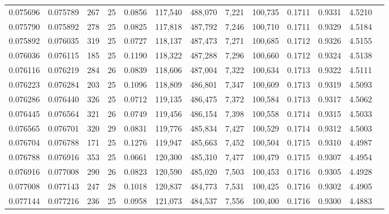 \begin{tabular}{rrrrrrrrrrrrr}
0.075696 & 0.075789 & 267 &  25 &                                     0.0856 & 117,540 & 488,070 &   7,221 & 100,735 & 0.1711 & 0.9331 & 4.5210 \\
0.075790 & 0.075892 & 278 &  25 &                                     0.0825 & 117,818 & 487,792 &   7,246 & 100,710 & 0.1711 & 0.9329 & 4.5184 \\
0.075892 & 0.076035 & 319 &  25 &                                     0.0727 & 118,137 & 487,473 &   7,271 & 100,685 & 0.1712 & 0.9326 & 4.5155 \\
0.076036 & 0.076115 & 185 &  25 &                                     0.1190 & 118,322 & 487,288 &   7,296 & 100,660 & 0.1712 & 0.9324 & 4.5138 \\
0.076116 & 0.076219 & 284 &  26 &                                     0.0839 & 118,606 & 487,004 &   7,322 & 100,634 & 0.1713 & 0.9322 & 4.5111 \\
0.076223 & 0.076284 & 203 &  25 &                                     0.1096 & 118,809 & 486,801 &   7,347 & 100,609 & 0.1713 & 0.9319 & 4.5093 \\
0.076286 & 0.076440 & 326 &  25 &                                     0.0712 & 119,135 & 486,475 &   7,372 & 100,584 & 0.1713 & 0.9317 & 4.5062 \\
0.076445 & 0.076564 & 321 &  26 &                                     0.0749 & 119,456 & 486,154 &   7,398 & 100,558 & 0.1714 & 0.9315 & 4.5033 \\
0.076565 & 0.076701 & 320 &  29 &                                     0.0831 & 119,776 & 485,834 &   7,427 & 100,529 & 0.1714 & 0.9312 & 4.5003 \\
0.076704 & 0.076788 & 171 &  25 &                                     0.1276 & 119,947 & 485,663 &   7,452 & 100,504 & 0.1715 & 0.9310 & 4.4987 \\
0.076788 & 0.076916 & 353 &  25 &                                     0.0661 & 120,300 & 485,310 &   7,477 & 100,479 & 0.1715 & 0.9307 & 4.4954 \\
0.076916 & 0.077008 & 290 &  26 &                                     0.0823 & 120,590 & 485,020 &   7,503 & 100,453 & 0.1716 & 0.9305 & 4.4928 \\
0.077008 & 0.077143 & 247 &  28 &                                     0.1018 & 120,837 & 484,773 &   7,531 & 100,425 & 0.1716 & 0.9302 & 4.4905 \\
0.077144 & 0.077216 & 236 &  25 &                                     0.0958 & 121,073 & 484,537 &   7,556 & 100,400 & 0.1716 & 0.9300 & 4.4883 \\

\end{tabular}
